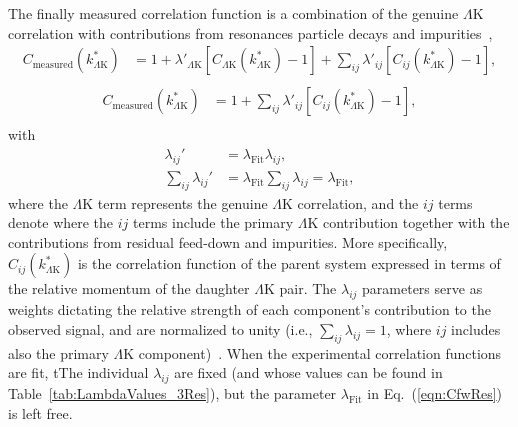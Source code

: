 \documentclass[ALICE,manyauthors]{cernphprep}
\newcommand{\LamK}{$\Lambda$K\xspace}
\begin{document}
The {\color{red}finally} measured correlation function is a combination of the genuine \LamK correlation with contributions from {\color{red}resonances} {\color{blue}particle decays} and impurities~\cite{Kisiel:2014mma},
{\color{red}
\begin{equation}
\begin{aligned}
\label{eqn:CfwRes} 
 C_{\mathrm{measured}}(k^{*}_{\Lambda\mathrm{K}}) &= 1 + \lambda'_{\Lambda\mathrm{K}}[C_{\Lambda\mathrm{K}}(k^{*}_{\Lambda\mathrm{K}}) - 1] + \sum\limits_{ij}  \lambda'_{ij}[C_{ij}(k^{*}_{\Lambda\mathrm{K}})-1], \\
\end{aligned} 
\end{equation}
}
{\color{blue}
\begin{equation}
\begin{aligned}
\label{eqn:CfwRes} 
 C_{\mathrm{measured}}(k^{*}_{\Lambda\mathrm{K}}) &= 1 + \sum\limits_{ij}  \lambda'_{ij}[C_{ij}(k^{*}_{\Lambda\mathrm{K}})-1], \\
\end{aligned} 
\end{equation}
}
with
\begin{equation}
\begin{aligned}
\label{eqn:CfwRes2} 
 \lambda_{ij}' &= \lambda_{\mathrm{Fit}}\lambda_{ij}, \\
 \sum\limits_{ij}\lambda_{ij}' &=  \lambda_{\mathrm{Fit}}\sum\limits_{ij}\lambda_{ij} = \lambda_{\mathrm{Fit}},
\end{aligned} 
\end{equation}
{\color{red}where the \LamK term represents the genuine \LamK correlation, and the $ij$ terms denote}
{\color{blue}where the $ij$ terms include the primary \LamK contribution together with} the contributions from residual feed-down and impurities.
More specifically, $C_{ij}(k^{*}_{\Lambda\mathrm{K}})$ is the correlation function of the parent system expressed in terms of the relative momentum of the daughter \LamK pair.  
The $\lambda_{ij}$ parameters serve as weights dictating the relative strength of each component's contribution to the observed signal, and are normalized to unity (i.e., $\sum_{ij} \lambda_{ij} = 1$, where $ij$ includes also the primary \LamK component)~\cite{Kisiel:2014mma, Acharya:2018gyz}.
{\color{blue}When the experimental correlation functions are fit, t}{\color{red}T}he individual $\lambda_{ij}$ are fixed (and whose values can be found in Table~\ref{tab:LambdaValues_3Res}), but the parameter $\lambda_{\mathrm{Fit}}$ in Eq.~{\color{blue}(}\ref{eqn:CfwRes}{\color{blue})} is left free.
\end{document}
